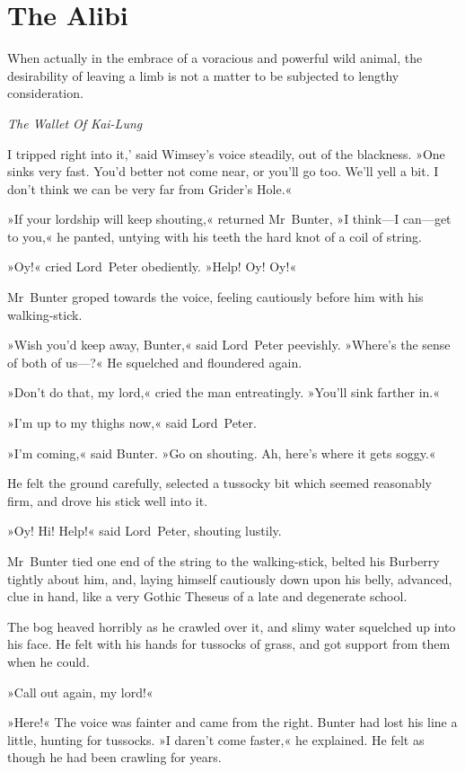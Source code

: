 
\chapter{The Alibi}

\epigraph{When actually in the embrace of a voracious and powerful wild animal, the desirability of leaving a limb is not a matter to be subjected to
lengthy consideration.}{\textit{The Wallet Of Kai-Lung}}


\lettrine[lines=4,ante=`]{I}{} tripped right into it,' said Wimsey's voice steadily, out of the blackness. »One sinks very fast. You'd better not come near, or you'll go too. We'll yell a bit. I don't think we can be very far from Grider's Hole.«

\zz
»If your lordship will keep shouting,« returned Mr~Bunter, »I think—I can—get to you,« he panted, untying with his teeth the hard knot of a coil of string.

»Oy!« cried Lord~Peter obediently. »Help! Oy! Oy!«

Mr~Bunter groped towards the voice, feeling cautiously before him with his walking-stick.

»Wish you'd keep away, Bunter,« said Lord~Peter peevishly. »Where's the sense of both of us—?« He squelched and floundered again.

»Don't do that, my lord,« cried the man entreatingly. »You'll sink farther in.«

»I'm up to my thighs now,« said Lord~Peter.

»I'm coming,« said Bunter. »Go on shouting. Ah, here's where it gets soggy.«

He felt the ground carefully, selected a tussocky bit which seemed reasonably firm, and drove his stick well into it.

»Oy! Hi! Help!« said Lord~Peter, shouting lustily.

Mr~Bunter tied one end of the string to the walking-stick, belted his Burberry tightly about him, and, laying himself cautiously down upon his belly, advanced, clue in hand, like a very Gothic Theseus of a late and degenerate school.

The bog heaved horribly as he crawled over it, and slimy water squelched up into his face. He felt with his hands for tussocks of grass, and got support from them when he could.

»Call out again, my lord!«

»Here!« The voice was fainter and came from the right. Bunter had lost his line a little, hunting for tussocks. »I daren't come faster,« he explained. He felt as though he had been crawling for years.

